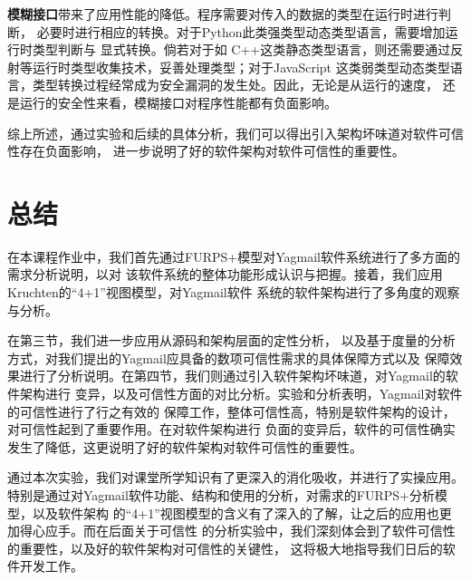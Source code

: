 \documentclass[UTF8,12pt,a4paper]{ctexart}
\begin{document}
    \textbf{模糊接口}带来了应用性能的降低。程序需要对传入的数据的类型在运行时进行判断，
    必要时进行相应的转换。对于Python此类强类型动态类型语言，需要增加运行时类型判断与
    显式转换。倘若对于如
    C++这类静态类型语言，则还需要通过反射等运行时类型收集技术，妥善处理类型；对于JavaScript
    这类弱类型动态类型语言，类型转换过程经常成为安全漏洞的发生处。因此，无论是从运行的速度，
    还是运行的安全性来看，模糊接口对程序性能都有负面影响。
    
    综上所述，通过实验和后续的具体分析，我们可以得出引入架构坏味道对软件可信性存在负面影响，
    进一步说明了好的软件架构对软件可信性的重要性。
    
\newpage
\section{总结}

    在本课程作业中，我们首先通过FURPS+模型对Yagmail软件系统进行了多方面的需求分析说明，以对
    该软件系统的整体功能形成认识与把握。接着，我们应用Kruchten的“4+1”视图模型，对Yagmail软件
    系统的软件架构进行了多角度的观察与分析。
    
    在第三节，我们进一步应用从源码和架构层面的定性分析，
    以及基于度量的分析方式，对我们提出的Yagmail应具备的数项可信性需求的具体保障方式以及
    保障效果进行了分析说明。在第四节，我们则通过引入软件架构坏味道，对Yagmail的软件架构进行
    变异，以及可信性方面的对比分析。实验和分析表明，Yagmail对软件的可信性进行了行之有效的
    保障工作，整体可信性高，特别是软件架构的设计，对可信性起到了重要作用。在对软件架构进行
    负面的变异后，软件的可信性确实发生了降低，这更说明了好的软件架构对软件可信性的重要性。

    通过本次实验，我们对课堂所学知识有了更深入的消化吸收，并进行了实操应用。
    特别是通过对Yagmail软件功能、结构和使用的分析，对需求的FURPS+分析模型，以及软件架构
    的“4+1”视图模型的含义有了深入的了解，让之后的应用也更加得心应手。而在后面关于可信性
    的分析实验中，我们深刻体会到了软件可信性的重要性，以及好的软件架构对可信性的关键性，
    这将极大地指导我们日后的软件开发工作。
    
\end{document}
